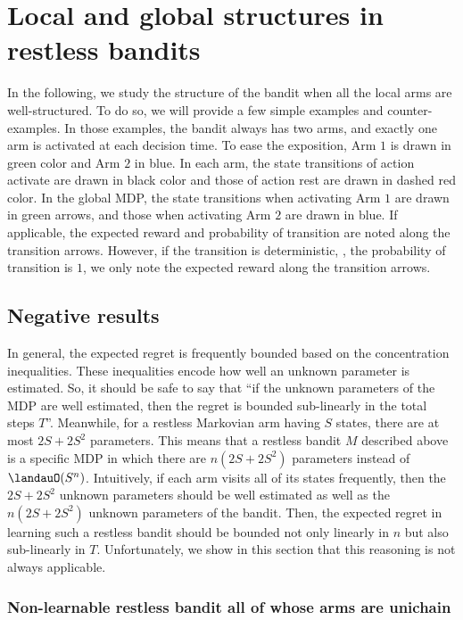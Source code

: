 \section{Local and global structures in restless bandits}
\label{ch:restless:sec:example}

In the following, we study the structure of the bandit when all the local arms are well-structured.
To do so, we will provide a few simple examples and counter-examples.
In those examples, the bandit always has two arms, and exactly one arm is activated at each decision time.
To ease the exposition, Arm $1$ is drawn in green color and Arm $2$ in blue.
In each arm, the state transitions of action activate are drawn in black color and those of action rest are drawn in dashed red color.
In the global MDP, the state transitions when activating Arm $1$ are drawn in green arrows, and those when activating Arm $2$ are drawn in blue.
If applicable, the expected reward and probability of transition are noted along the transition arrows.
However, if the transition is deterministic, \ie, the probability of transition is $1$, we only note the expected reward along the transition arrows.

\subsection{Negative results}

In general, the expected regret is frequently bounded based on the concentration inequalities. 
These inequalities encode how well an unknown parameter is estimated.
So, it should be safe to say that ``if the unknown parameters of the MDP are well estimated, then the regret is bounded sub-linearly in the total steps $T$''.
Meanwhile, for a restless Markovian arm having $S$ states, there are at most $2S+2S^2$ parameters.
This means that a restless bandit $M$ described above is a specific MDP in which there are $n(2S+2S^2)$ parameters instead of $\landauO(S^{n})$.
Intuitively, if each arm visits all of its states frequently, then the $2S+2S^2$ unknown parameters should be well estimated as well as the $n(2S+2S^2)$ unknown parameters of the bandit.
Then, the expected regret in learning such a restless bandit should be bounded not only linearly in $n$ but also sub-linearly in $T$.
Unfortunately, we show in this section that this reasoning is not always applicable.

\subsubsection{Non-learnable restless bandit all of whose arms are unichain}

